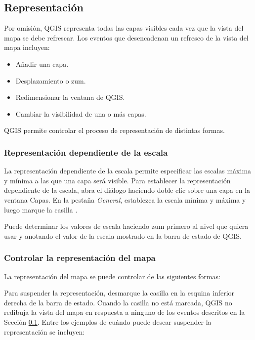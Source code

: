 \subsection{Representación}\label{subsec:redraw_events}

Por omisión, QGIS representa todas las capas visibles cada vez que la vista del mapa se debe refrescar. Los eventos 
que desencadenan un refresco de la vista del mapa incluyen:

\begin{itemize}
\item Añadir una capa.
\item Desplazamiento o zum.
\item Redimensionar la ventana de QGIS.
\item Cambiar la visibilidad de una o más capas.
\end{itemize}

QGIS permite controlar el proceso de representación de distintas formas.

\subsubsection{Representación dependiente de la escala}
\label{label_scaledepend}

La representación dependiente de la escala permite especificar las escalas máxima y mínima a las que una capa será 
visible. Para establecer la representación dependiente de la escala, abra el diálogo   haciendo 
doble clic sobre una capa en la ventana Capas. En la pestaña \textit{General}, establezca la escala mínima y máxima y luego marque la casilla .

Puede determinar los valores de escala haciendo zum primero al nivel que quiera usar y anotando el valor de la 
escala mostrado en la barra de estado de QGIS.

\subsubsection{Controlar la representación del mapa}\label{label_controlmap}

La representación del mapa se puede controlar de las siguientes formas:

\label{label_suspendrender}

Para suspender la representación, desmarque la casilla  en la esquina inferior derecha de la 
barra de estado. Cuando la casilla  no está marcada, QGIS no redibuja la vista del mapa en 
respuesta a ninguno de los eventos descritos en la Sección
\ref{subsec:redraw_events}. Entre los ejemplos de cuándo puede desear suspender la representación se incluyen:

